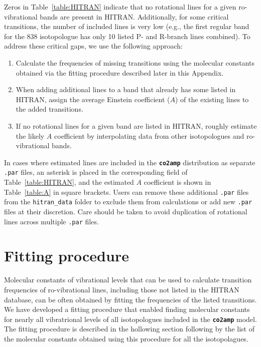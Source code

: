 Zeros in Table~\ref{table:HITRAN} indicate that no rotational lines for a given ro-vibrational bands are present in HITRAN. Additionally, for some critical transitions, the number of included lines is very low (e.g., the first regular band for the 838 isotopologue has only 10 listed P- and R-branch lines combined). To address these critical gaps, we use the following approach:

\begin{enumerate}
    \item Calculate the frequencies of missing transitions using the molecular constants obtained via the fitting procedure described later in this Appendix.
    \item When adding additional lines to a band that already has some listed in HITRAN, assign the average Einstein coefficient ($A$) of the existing lines to the added transitions.
    \item If no rotational lines for a given band are listed in HITRAN, roughly estimate the likely $A$ coefficient by interpolating data from other isotopologues and ro-vibrational bands.
\end{enumerate}

In cases where estimated lines are included in the \textbf{\texttt{co2amp}} distribution as separate \texttt{.par} files, an asterisk is placed in the corresponding field of Table~\ref{table:HITRAN}, and the estimated $A$ coefficient is shown in Table~\ref{table:A} in square brackets. Users can remove these additional \texttt{.par} files from the \texttt{hitran\_data} folder to exclude them from calculations or add new \texttt{.par} files at their discretion. Care should be taken to avoid duplication of rotational lines across multiple \texttt{.par} files.



\section*{Fitting procedure}

Molecular constants of vibrational levels that can be used to calculate transition frequencies of ro-vibrational lines, including those not listed in the HITRAN database, can be often obtained by fitting the frequencies of the listed transitions. We have developed a fitting procedure that enabled finding molecular constants for nearly all vibratrional levels of all  isotopologues included in the \textbf{\texttt{co2amp}} model. The fitting procedure is described in the hollowing section following by the list of the molecular constants obtained using this procedure for all the isotopolagues.


